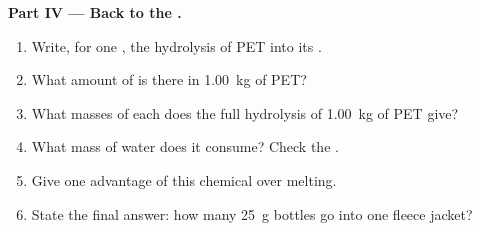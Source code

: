 \begin{problem}
\medskip
\noindent\textbf{Part IV --- Back to the .}
\begin{enumerate}[resume]
  \item Write, for one , the hydrolysis of PET into its
        .
  \item What amount of  is there in \qty{1.00}{kg} of PET?
  \item What masses of each  does the full hydrolysis of
        \qty{1.00}{kg} of PET give?
  \item What mass of water does it consume? Check the .
  \item Give one advantage of this chemical  over melting.
  \item State the final answer: how many \qty{25}{g} bottles go into one
        fleece jacket?
\end{enumerate}
\end{problem}
